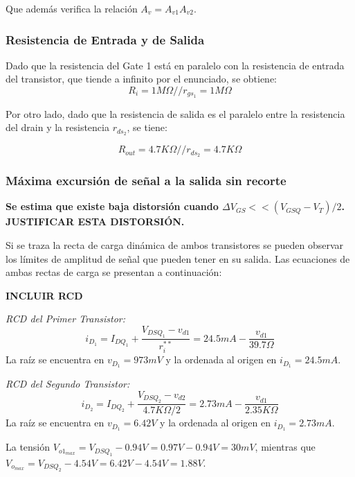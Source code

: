 \documentclass[a4paper, 10pt, spanish]{article}
\begin{document}
Que además verifica la relación $A_v = A_{v1} A_{v2}$.

\subsubsection{Resistencia de Entrada y de Salida}
Dado que la resistencia del Gate 1 está en paralelo con la resistencia de entrada del transistor, que tiende a infinito por el enunciado, se obtiene:
\begin{equation}
  R_i=1M\Omega // r_{gs_1} = 1M\Omega
\end{equation}

Por otro lado, dado que la resistencia de salida es el paralelo entre la resistencia del drain y la resistencia $r_{ds_2}$, se tiene:

\begin{equation}
  R_{out}=4.7K\Omega // r_{ds_2} = 4.7K\Omega
\end{equation}

\subsubsection{Máxima excursión de señal a la salida sin recorte}

\textbf{Se estima que existe baja distorsión cuando $\Delta V_{GS} << (V_{GSQ}-V_T)/2$. JUSTIFICAR ESTA DISTORSIÓN.}

Si se traza la recta de carga dinámica de ambos transistores se pueden observar los límites de amplitud de señal que pueden tener en su salida. Las ecuaciones de ambas rectas de carga se presentan a continuación:


\textbf{INCLUIR RCD}

\textit{RCD del Primer Transistor:}
\begin{equation}
  i_{D_1} = I_{DQ_1} + \frac{V_{DSQ_1} - v_{d1}}{r_i^{**}} = 24.5mA - \frac{v_{d1}}{39.7\Omega}
\end{equation}
La raíz se encuentra en $v_{D_1} = 973mV$ y la ordenada al origen en $i_{D_1} = 24.5mA$.

\textit{RCD del Segundo Transistor:}
\begin{equation}
  i_{D_2} = I_{DQ_2} + \frac{V_{DSQ_2} - v_{d2}}{4.7K\Omega/2} = 2.73mA - \frac{v_{d1}}{2.35K\Omega}
\end{equation}
La raíz se encuentra en $v_{D_1} = 6.42V$ y la ordenada al origen en $i_{D_1} = 2.73mA$.

La tensión $V_{o1_{max}}= V_{DSQ_1} - 0.94V = 0.97V - 0.94V = 30mV$, mientras que $V_{o_{max}}= V_{DSQ_2} - 4.54V = 6.42V - 4.54V = 1.88V$.
\end{document}
